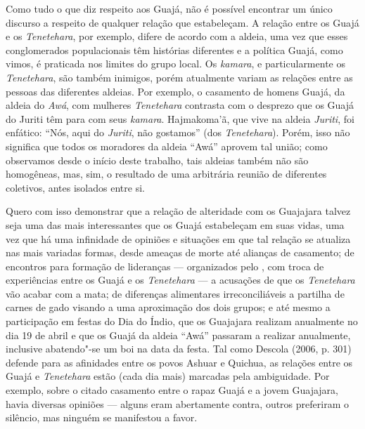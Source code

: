 Como tudo o que diz respeito aos Guajá, não é possível encontrar um
único discurso a respeito de qualquer relação que estabeleçam. A relação
entre os Guajá e os \emph{Tenetehara}, por exemplo, difere de acordo com
a aldeia, uma vez que esses conglomerados populacionais têm histórias
diferentes e a política Guajá, como vimos, é praticada nos limites do
grupo local. Os \emph{kamara}, e particularmente os \emph{Tenetehara},
são também inimigos, porém atualmente variam as relações entre as
pessoas das diferentes aldeias. Por exemplo, o casamento de homens
Guajá, da aldeia do  \emph{Awá}, com mulheres \emph{Tenetehara}
contrasta com o desprezo que os Guajá do Juriti têm para com seus
\emph{kamara}. Hajmakoma'ã, que vive na aldeia \emph{Juriti}, foi
enfático: ``Nós, aqui do \emph{Juriti}, não gostamos'' (dos
\emph{Tenetehara}). Porém, isso não significa que todos os moradores da
aldeia ``Awá'' aprovem tal união; como observamos desde o início deste
trabalho, tais aldeias também não são homogêneas, mas, sim, o resultado
de uma arbitrária reunião de diferentes coletivos, antes isolados entre
si.

Quero com isso demonstrar que a relação de alteridade com os Guajajara
talvez seja uma das mais interessantes que os Guajá estabeleçam em suas
vidas, uma vez que há uma infinidade de opiniões e situações em que tal
relação se atualiza nas mais variadas formas, desde ameaças de morte até
alianças de casamento; de encontros para formação de lideranças ---
organizados pelo , com troca de experiências entre os Guajá e os
\emph{Tenetehara} --- a acusações de que os \emph{Tenetehara} vão acabar
com a mata; de diferenças alimentares irreconciliáveis a partilha de
carnes de gado visando a uma aproximação dos dois grupos; e até mesmo a
participação em festas do Dia do Índio, que os Guajajara realizam
anualmente no dia 19 de abril e que os Guajá da aldeia ``Awá'' passaram a
realizar anualmente, inclusive abatendo"-se um boi na data da festa. Tal
como Descola (2006, p. 301) defende para as afinidades entre os povos
Ashuar e Quichua, as relações entre os Guajá e \emph{Tenetehara} estão
(cada dia mais) marcadas pela ambiguidade. Por exemplo, sobre o citado
casamento entre o rapaz Guajá e a jovem Guajajara, havia diversas
opiniões --- alguns eram abertamente contra, outros preferiram o silêncio,
mas ninguém se manifestou a favor.

